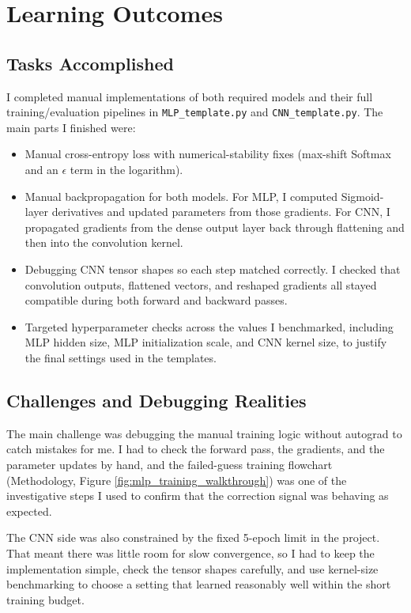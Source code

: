 \section{Learning Outcomes}

\subsection{Tasks Accomplished}
I completed manual implementations of both required models and their full training/evaluation pipelines in \texttt{MLP\_template.py} and \texttt{CNN\_template.py}. The main parts I finished were:
\begin{itemize}
	\item Manual cross-entropy loss with numerical-stability fixes (max-shift Softmax and an $\epsilon$ term in the logarithm).
	\item Manual backpropagation for both models. For MLP, I computed Sigmoid-layer derivatives and updated parameters from those gradients. For CNN, I propagated gradients from the dense output layer back through flattening and then into the convolution kernel.
	\item Debugging CNN tensor shapes so each step matched correctly. I checked that convolution outputs, flattened vectors, and reshaped gradients all stayed compatible during both forward and backward passes.
	\item Targeted hyperparameter checks across the values I benchmarked, including MLP hidden size, MLP initialization scale, and CNN kernel size, to justify the final settings used in the templates.
\end{itemize}

\subsection{Challenges and Debugging Realities}
The main challenge was debugging the manual training logic without autograd to catch mistakes for me. I had to check the forward pass, the gradients, and the parameter updates by hand, and the failed-guess training flowchart (Methodology, Figure \ref{fig:mlp_training_walkthrough}) was one of the investigative steps I used to confirm that the correction signal was behaving as expected.

The CNN side was also constrained by the fixed 5-epoch limit in the project. That meant there was little room for slow convergence, so I had to keep the implementation simple, check the tensor shapes carefully, and use kernel-size benchmarking to choose a setting that learned reasonably well within the short training budget.

